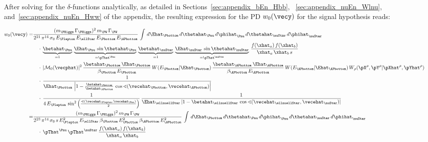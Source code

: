 After solving for the $\delta$-functions analytically, as detailed in Sections~\ref{sec:appendix_bEn_Hbb}, ~\ref{sec:appendix_nuEn_Wlnu}, and~\ref{sec:appendix_nuEn_Hww} of the appendix,
the resulting expression for the PD $w_{0}(\vecy)$ for the signal hypothesis reads:
\begin{linenowrapper}
\begin{align}
w_{0}(\vecy) 
 = & \frac{(m_{\PHiggs} \, \Gamma_{\PHiggs})^{2} \, m_{\PW} \, \Gamma_{\PW}}{2^{21} \, \pi^{14} \, \sigma_{0} \, E_{\Plepton} \, E_{\ellStar} \, E_{\Pbottom} \, E_{\APbottom}} \, \int \,
d\Ehat_{\Pbottom} \, d\thetahat_{\Pnu} \, d\phihat_{\Pnu} \, d\thetahat_{\nuStar} \, d\phihat_{\nuStar}  \nonumber \\
 & \quad \cdot \, \underbrace{\betahat_{\Pnu}}_{= 1} \, \underbrace{\Ehat_{\Pnu} \, \sin\thetahat_{\Pnu}}_{= \pThat^{\Pnu}} \, 
  \underbrace{\betahat_{\nuStar}}_{= 1} \, \underbrace{\Ehat_{\nuStar} \, \sin\thetahat_{\nuStar}}_{= \pThat^{\nuStar}} \, 
\frac{f(\xhat_{a}) \, f(\xhat_{b})}{\xhat_{a} \, \xhat_{b} \, s} \nonumber \\
 & \quad \cdot \, \vert \mathcal{M}_{0}(\vecphat) \vert^{2} \, 
\frac{\betahat_{\Pbottom} \, \Ehat_{\Pbottom}}{\beta_{\Pbottom} \, E_{\Pbottom}} \, W(E_{\Pbottom}|\Ehat_{\Pbottom}) \, 
\frac{\betahat_{\APbottom} \, \Ehat_{\APbottom}}{\beta_{\APbottom} \, E_{\APbottom}} \, W(E_{\APbottom}|\Ehat_{\APbottom}) \,
W_{\rho}( \pX^{\rho},\pY^{\rho} | \pXhat^{\rho},\pYhat^{\rho} ) \nonumber \\
 & \quad \cdot \, \frac{1}{\Ehat_{\Pbottom} \, \left\lvert 1 - \frac{\betahat_{\Pbottom}}{\betahat_{\APbottom}} \, \cos\sphericalangle(\vecehat_{\Pbottom},\vecehat_{\APbottom}) \right\rvert} \nonumber \\
 & \quad \cdot \, \frac{1}{4 \, E_{\Plepton} \, \sin^{2}\left(\frac{\sphericalangle(\vecehat_{\Plepton},\vecehat_{\Pnu})}{2}\right)} \,
\frac{1}{\Ehat_{\ellnuellStar} \left\lvert 1 - \betahat_{\ellnuellStar} \, \cos\sphericalangle(\vecehat_{\ellnuellStar},\vecehat_{\nuStar}) \right\rvert} \nonumber \\
 = & \frac{(m_{\PHiggs} \, \Gamma_{\PHiggs})^{2} \, m_{\PW} \, \Gamma_{\PW}}{2^{23} \, \pi^{14} \, \sigma_{0} \, s \, 
  E_{\Plepton}^{2} \, E_{\ellStar} \, \beta_{\Pbottom} \, E_{\Pbottom}^{2} \, \beta_{\APbottom} \, E_{\APbottom}^{2}} \, \int \,
d\Ehat_{\Pbottom} \, d\thetahat_{\Pnu} \, d\phihat_{\Pnu} \, d\thetahat_{\nuStar} \, d\phihat_{\nuStar} \nonumber \\
 & \quad \cdot \, \pThat^{\Pnu} \, \pThat^{\nuStar} \, 
\frac{f(\xhat_{a}) \, f(\xhat_{b})}{\xhat_{a} \, \xhat_{b}} \nonumber \\

\end{align}
\end{linenowrapper}
